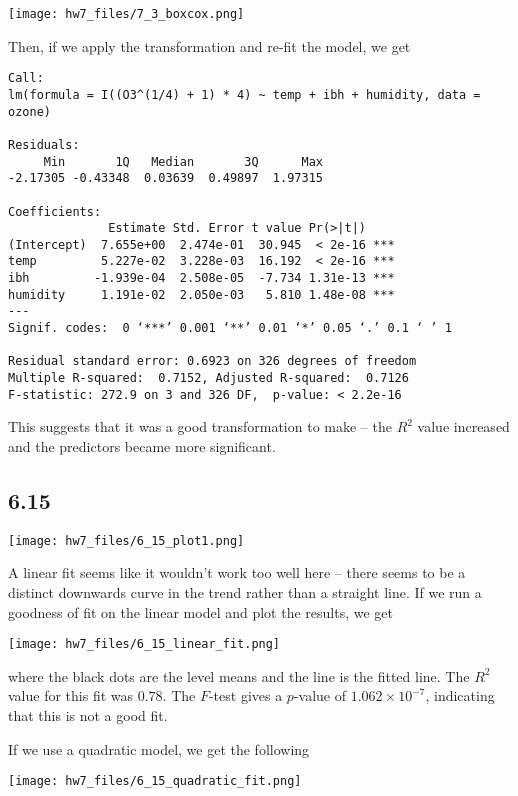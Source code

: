 \documentclass{article}
\begin{document}
\texttt{[image: hw7\_files/7\_3\_boxcox.png]}

Then, if we apply the transformation and re-fit the model, we get 

\begin{verbatim}
Call:
lm(formula = I((O3^(1/4) + 1) * 4) ~ temp + ibh + humidity, data = ozone)

Residuals:
     Min       1Q   Median       3Q      Max 
-2.17305 -0.43348  0.03639  0.49897  1.97315 

Coefficients:
              Estimate Std. Error t value Pr(>|t|)    
(Intercept)  7.655e+00  2.474e-01  30.945  < 2e-16 ***
temp         5.227e-02  3.228e-03  16.192  < 2e-16 ***
ibh         -1.939e-04  2.508e-05  -7.734 1.31e-13 ***
humidity     1.191e-02  2.050e-03   5.810 1.48e-08 ***
---
Signif. codes:  0 ‘***’ 0.001 ‘**’ 0.01 ‘*’ 0.05 ‘.’ 0.1 ‘ ’ 1

Residual standard error: 0.6923 on 326 degrees of freedom
Multiple R-squared:  0.7152, Adjusted R-squared:  0.7126 
F-statistic: 272.9 on 3 and 326 DF,  p-value: < 2.2e-16
\end{verbatim}
This suggests that it was a good transformation to make -- the $R^2$ value increased and the predictors became more significant.
\subsection*{6.15}
\texttt{[image: hw7\_files/6\_15\_plot1.png]}

A linear fit seems like it wouldn't work too well here -- there seems to be a distinct downwards curve in the trend rather than a straight line.
If we run a goodness of fit on the linear model and plot the results, we get 

\texttt{[image: hw7\_files/6\_15\_linear\_fit.png]}

where the black dots are the level means and the line is the fitted line. The $R^2$ value for this fit was $0.78$. The $F$-test gives a $p$-value of $1.062\times10^{-7}$, indicating that this is not a good fit.

If we use a quadratic model, we get the following

\texttt{[image: hw7\_files/6\_15\_quadratic\_fit.png]}
\end{document}
